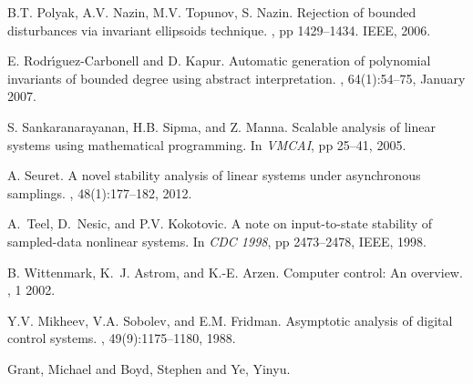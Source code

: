 \begin{thebibliography}{10}

B.T. Polyak, A.V. Nazin, M.V. Topunov, S. Nazin.
\newblock Rejection of bounded disturbances via invariant ellipsoids technique.
, pp 1429--1434. IEEE, 2006.

E. Rodr\'{\i}guez-Carbonell and D. Kapur.
\newblock Automatic generation of polynomial invariants of bounded degree using
  abstract interpretation.
, 64(1):54--75, January 2007.

S. Sankaranarayanan, H.B. Sipma, and Z. Manna.
\newblock Scalable analysis of linear systems using mathematical programming.
\newblock In {\em VMCAI}, pp 25--41, 2005.

A. Seuret.
\newblock A novel stability analysis of linear systems under asynchronous
  samplings.
, 48(1):177--182, 2012.

A.~Teel, D.~Nesic, and P.V. Kokotovic.
\newblock A note on input-to-state stability of sampled-data nonlinear systems.
\newblock In {\em CDC 1998}, pp 2473--2478, IEEE, 1998.

B. Wittenmark, K.~J. Astrom, and K.-E. Arzen.
\newblock Computer control: An overview.
, 1 2002.

Y.V. Mikheev, V.A. Sobolev, and E.M. Fridman.
\newblock Asymptotic analysis of digital control systems.
, 49(9):1175--1180, 1988.

Grant, Michael and Boyd, Stephen and Ye, Yinyu.
  

\end{thebibliography}






























